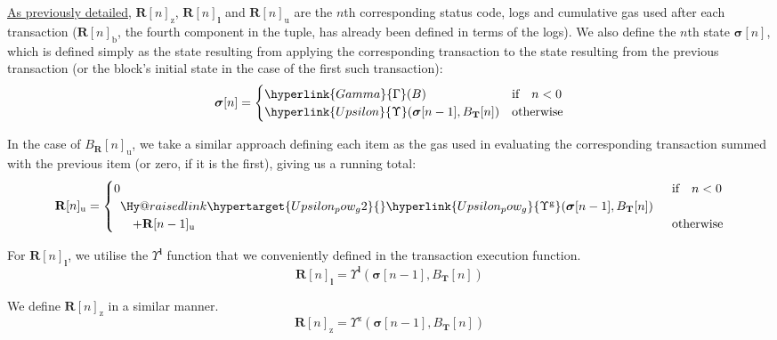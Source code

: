 \documentclass[9pt,oneside]{amsart}
\makeatletter
\newcommand{\linkdest}[1]{\Hy@raisedlink{\hypertarget{#1}{}}}
\makeatother
\begin{document}
\begin{multicols}{2}
\hyperlink{Transaction_Receipt}{As previously detailed}, $\mathbf{R}[n]_{\mathrm{z}}$, $\mathbf{R}[n]_{\mathbf{l}}$ and $\mathbf{R}[n]_{\mathrm{u}}$ are the $n$th corresponding status code, logs and cumulative gas used after each transaction ($\mathbf{R}[n]_{\mathrm{b}}$, the fourth component in the tuple, has already been defined in terms of the logs). We also define the $n$th state $\boldsymbol{\sigma}[n]$, which is defined simply as the state resulting from applying the corresponding transaction to the state resulting from the previous transaction (or the block's initial state in the case of the first such transaction):
\begin{equation}
\boldsymbol{\sigma}[n] = \begin{cases} \hyperlink{Gamma}{\Gamma}(B) & \text{if} \quad n < 0 \\ \hyperlink{Upsilon}{\Upsilon}(\boldsymbol{\sigma}[n - 1], B_{\mathbf{T}}[n]) & \text{otherwise} \end{cases}
\end{equation}

In the case of \hyperlink{Transaction_Receipt}{$B_{\mathbf{R}}[n]_{\mathrm{u}}$}, we take a similar approach defining each item as the gas used in evaluating the corresponding transaction summed with the previous item (or zero, if it is the first), giving us a running total:
\begin{equation}
\mathbf{R}[n]_{\mathrm{u}} = \begin{cases} 0 & \text{if} \quad n < 0 \\
\begin{array}[b]{l}
\linkdest{Upsilon_pow_g2}\hyperlink{Upsilon_pow_g}{\Upsilon^{\mathrm{g}}}(\boldsymbol{\sigma}[n - 1], B_{\mathbf{T}}[n])\\ \quad + \mathbf{R}[n-1]_{\mathrm{u}}
\end{array}
 & \text{otherwise} \end{cases}
\end{equation}

For $\mathbf{R}[n]_{\mathbf{l}}$, we utilise the \hyperlink{Upsilon_pow_l}{$\Upsilon^\mathbf{l}$} function that we conveniently defined in the transaction execution function.
\begin{equation}
\mathbf{R}[n]_{\mathbf{l}} =
\Upsilon^{\mathbf{l}}(\boldsymbol{\sigma}[n - 1], B_{\mathbf{T}}[n])
\end{equation}

We define \hyperlink{Upsilon_pow_z}{$\mathbf{R}[n]_{\mathrm{z}}$} in a similar manner.
\begin{equation}
\mathbf{R}[n]_{\mathrm{z}} =
\Upsilon^{\mathrm{z}}(\boldsymbol{\sigma}[n - 1], B_{\mathbf{T}}[n])
\end{equation}


\end{multicols}
\end{document}
